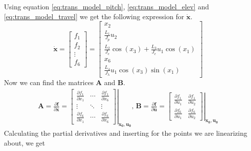 Using equation \eqref{eq:trans_model_pitch}, \eqref{eq:trans_model_elev} and \eqref{eq:trans_model_travel} we get the following expression for $\mathbf{\dot{x}}$.
\begin{equation*}
    \mathbf{\dot{x}} = 
    \begin{bmatrix}
        f_1 \\ f_2 \\ \vdots \\ f_6
    \end{bmatrix}
    =
    \begin{bmatrix}
        x_2 \\ \frac{L_1}{J_p}u_2 \\ \frac{L_2}{J_e}\cos(x_3) + \frac{L_3}{J_e} u_1 \cos(x_1) \\ x_6 \\ \frac{L_4}{J_\lambda}u_1 \cos(x_3) \sin(x_1)
    \end{bmatrix}
\end{equation*}
Now we can find the matrices \textbf{A} and \textbf{B}.
\begin{gather*}
    \mathbf{A} = \frac{\partial \mathbf{f}}{\partial \mathbf{x}} = 
    \left.
    \begin{bmatrix}
        \frac{\partial f_1}{\partial x_1} & \cdots &\frac{\partial f_1}{\partial x_6} \\
        \vdots & \ddots & \vdots \\
        \frac{\partial f_6}{\partial x_1} & \cdots & \frac{\partial f_6}{\partial x_6}
    \end{bmatrix}
    \right|_{\mathbf{x_0}, \mathbf{u_0}}
    \text{, }
    \mathbf{B} = \frac{\partial \mathbf{f}}{\partial \mathbf{u}} = 
    \left.
    \begin{bmatrix}
        \frac{\partial f_1}{\partial u_1} & \frac{\partial f_1}{\partial u_2} \\
        \frac{\partial f_6}{\partial u_1} & \frac{\partial f_6}{\partial u_2}
    \end{bmatrix}
    \right|_{\mathbf{x_0}, \mathbf{u_0}}
\end{gather*}
Calculating the partial derivatives and inserting for the points we are linearizing about, we get
